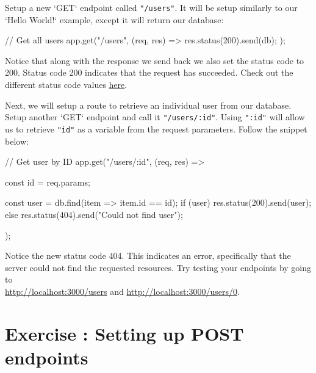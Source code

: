 \documentclass{42-en}
\begin{document}
    Setup a new `GET` endpoint called \texttt{"/users"}. It will be setup similarly to our `Hello World!` example, except it will return our database:
\begin{42jscode}
        // Get all users
        app.get("/users", (req, res) => {
            res.status(200).send(db);
        });
\end{42jscode}

    Notice that along with the response we send back we also set the status code to 200. Status code 200 indicates that the request has succeeded. Check out the different status code values \href{https://developer.mozilla.org/en-US/docs/Web/HTTP/Status}{here}.

    Next, we will setup a route to retrieve an individual user from our database. Setup another `GET` endpoint and call it \texttt{"/users/:id"}. Using \texttt{":id"} will allow us to retrieve \texttt{"id"} as a variable from the request parameters. Follow the snippet below:
\begin{42jscode}
        // Get user by ID
        app.get("/users/:id", (req, res) => {
            const { id } = req.params;

            const user = db.find(item => item.id == id);
            if (user) {
                res.status(200).send(user);
            } else {
                res.status(404).send("Could not find user");
            }
        });
\end{42jscode}

    Notice the new status code 404. This indicates an error, specifically that the server could not find the requested resources. Try testing your endpoints by going to \\
\href{http://localhost:3000/users}{http://localhost:3000/users} and \href{http://localhost:3000/users/0}{http://localhost:3000/users/0}.
\newpage
\nextexercice

\chapter{Exercise \exercicenumber: Setting up POST endpoints}
\end{document}
